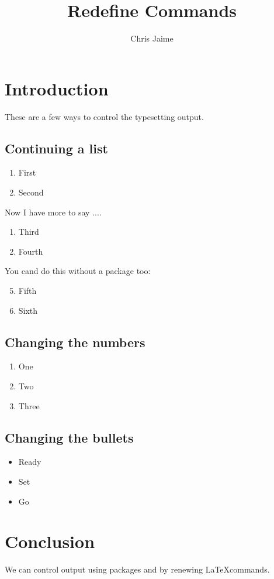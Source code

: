 \documentclass{article}
\title{Redefine Commands}
\author{Chris Jaime}
\date{}
\begin{document}
\maketitle

\section{Introduction}
These are a few ways to control the typesetting output.

\subsection{Continuing a list}
\begin{enumerate}
\item First
\item Second
\end{enumerate}

Now I have more to say ....

\begin{enumerate}[resume]
\item Third
\item Fourth
\end{enumerate}

You cand do this without a package too:

\begin{enumerate}
\setcounter{enumi}{4} %
\item Fifth
\item Sixth
\end{enumerate}

\subsection{Changing the numbers}
\renewcommand{\theenumi}{\Alph{enumi}}
\begin{enumerate}
\item One
\item Two
\item Three
\end{enumerate}

\subsection{Changing the bullets}
\renewcommand{\labelitemi}{$\rightarrow$}
\begin{itemize}
\item Ready
\item Set
\item Go
\end{itemize}


\section{Conclusion}
We can control output using packages and by renewing \LaTeX commands.
\end{document}
